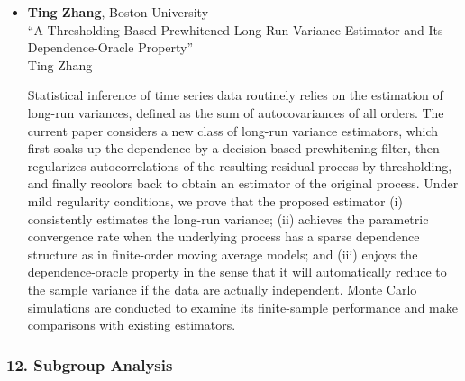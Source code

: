 \begin{itemize}
\item \textbf{Ting Zhang}, Boston University \\
``A Thresholding-Based Prewhitened Long-Run Variance Estimator and Its Dependence-Oracle Property'' \\
Ting Zhang


Statistical inference of time series data routinely relies on the estimation of long-run variances, defined as the sum of autocovariances of all orders. The current paper considers a new class of long-run variance estimators, which first soaks up the dependence by a decision-based prewhitening filter, then regularizes autocorrelations of the resulting residual process by thresholding, and finally recolors back to obtain an estimator of the original process. Under mild regularity conditions, we prove that the proposed estimator (i) consistently estimates the long-run variance; (ii) achieves the parametric convergence rate when the underlying process has a sparse dependence structure as in finite-order moving average models; and (iii) enjoys the dependence-oracle property in the sense that it will automatically reduce to the sample variance if the data are actually independent. Monte Carlo simulations are conducted to examine its finite-sample performance and make comparisons with existing estimators.

\end{itemize}

\subsubsection*{12. Subgroup Analysis}

